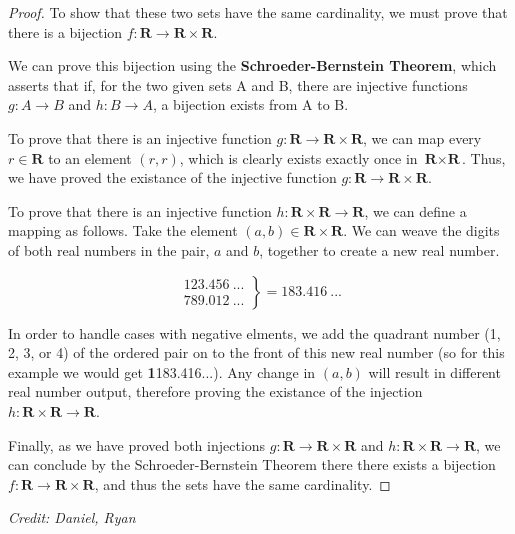 \documentclass{article}
\begin{document}
\begin{proof}
    To show that these two sets have the same cardinality, we must prove that there is a bijection $f : \textbf{R} \rightarrow \textbf{R} \times \textbf{R}$.

    We can prove this bijection using the \textbf{Schroeder-Bernstein Theorem}, which asserts that if, for the two given sets A and B, there are injective functions $g : A \rightarrow B$ and $h: B \rightarrow A$, a bijection exists from A to B.

    To prove that there is an injective function $g : \textbf{R} \rightarrow \textbf{R} \times \textbf{R}$, we can map every $r \in \textbf{R}$ to an element $(r, r)$, which is clearly exists exactly once in $\textbf{R} \times \textbf{R}$. Thus, we have proved the existance of the injective function $g : \textbf{R} \rightarrow \textbf{R} \times \textbf{R}$.

    To prove that there is an injective function $h : \textbf{R} \times \textbf{R} \rightarrow \textbf{R}$, we can define a mapping as follows. Take the element $(a, b) \in \textbf{R} \times \textbf{R}$. We can weave the digits of both real numbers in the pair, $a$ and $b$, together to create a new real number.

    \begin{equation}
        \left.
            \begin{array}{cc}
                123.456\:... \\
                789.012\:...
    	    \end{array}
        \right\} = 183.416\:...
    \end{equation}

    In order to handle cases with negative elments, we add the quadrant number (1, 2, 3, or 4) of the ordered pair on to the front of this new real number (so for this example we would get \textbf{1}183.416\:...). Any change in $(a, b)$ will result in different real number output, therefore proving the existance of the injection $h : \textbf{R} \times \textbf{R} \rightarrow \textbf{R}$.

    Finally, as we have proved both injections $g : \textbf{R} \rightarrow \textbf{R} \times \textbf{R}$ and $h : \textbf{R} \times \textbf{R} \rightarrow \textbf{R}$, we can conclude by the Schroeder-Bernstein Theorem there there exists a bijection $f : \textbf{R} \rightarrow \textbf{R} \times \textbf{R}$, and thus the sets have the same cardinality.
\end{proof}

\textit{Credit: Daniel, Ryan}
\end{document}
